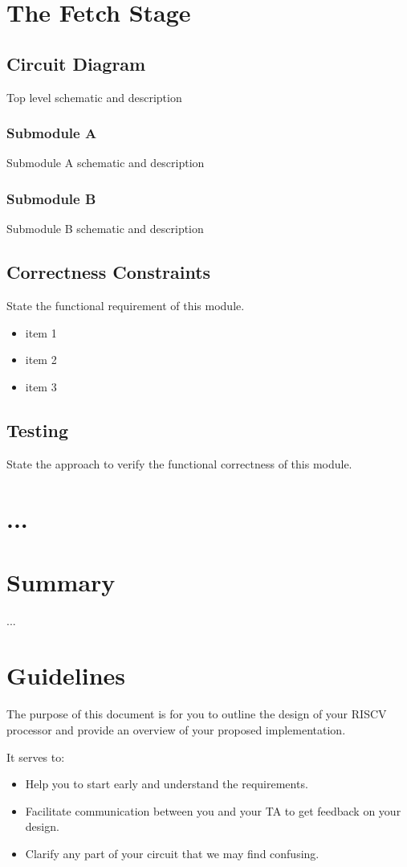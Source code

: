\documentclass[10pt]{article}
\begin{document}
\section{The Fetch Stage}

\subsection{Circuit Diagram}
Top level schematic and description
\subsubsection{Submodule A}
Submodule A schematic and description
\subsubsection{Submodule B}
Submodule B schematic and description

\subsection{Correctness Constraints}
State the functional requirement of this module.
\begin{itemize}
\item item 1
\item item 2
\item item 3
\end{itemize}

\subsection{Testing}
State the approach to verify the functional correctness of this module.

\section{...}

\section{Summary}
...

\section{Guidelines}
The purpose of this document is for you to outline the design of your RISCV processor and provide an overview of your proposed implementation. 

It serves to:
\begin{itemize}
\item Help you to start early and understand the requirements.
\item Facilitate communication between you and your TA to get feedback on your design.
\item Clarify any part of your circuit that we may find confusing.
\end{itemize}
\end{document}
